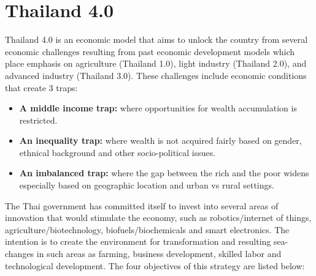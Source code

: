\documentclass[]{book}
\providecommand{\tightlist}{%
  \setlength{\itemsep}{0pt}\setlength{\parskip}{0pt}}
\begin{document}
\hypertarget{thailand-4.0}{%
\section{Thailand 4.0}\label{thailand-4.0}}

Thailand 4.0 is an economic model that aims to unlock the country from several economic challenges resulting from past economic development models which place emphasis on agriculture (Thailand 1.0), light industry (Thailand 2.0), and advanced industry (Thailand 3.0). These challenges include economic conditions that create 3 traps:

\begin{itemize}
\tightlist
\item
  \textbf{A middle income trap:} where opportunities for wealth accumulation is restricted.
\item
  \textbf{An inequality trap:} where wealth is not acquired fairly based on gender, ethnical background and other socio-political issues.
\item
  \textbf{An imbalanced trap:} where the gap between the rich and the poor widens especially based on geographic location and urban vs rural settings.
\end{itemize}

The Thai government has committed itself to invest into several areas of innovation that would stimulate the economy, such as robotics/internet of things, agriculture/biotechnology, biofuels/biochemicals and smart electronics. \citep{TMC2016} The intention is to create the environment for transformation and resulting sea-changes in such areas as farming, business development, skilled labor and technological development. \citep{RTE2016} The four objectives of this strategy are listed below:
\end{document}
